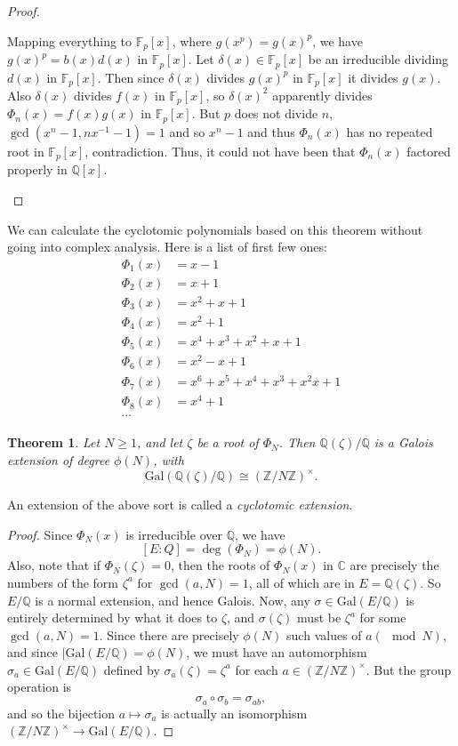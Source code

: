 \documentclass[12pt]{report}
\newtheorem{thm}{Theorem}[section]
\theoremstyle{definition}
\def\ZZ{\mathbb{Z}}
\def\CC{\mathbb{C}}
\def\QQ{\mathbb{Q}}
\def\FF{\mathbb{F}}
\def\Gal{\text{Gal}}
\begin{document}
\begin{proof}
\begin{enumerate}
        Mapping everything to $\FF_p[x]$, where $g(x^p) = g(x)^p$, we have $g(x)^p= b(x)d(x)$ in $\FF_p[x]$. Let $\delta(x) \in \FF_p[x]$ be an irreducible dividing $d(x)$ in $\FF_p[x]$. Then since $\delta(x)$ divides $g(x)^p$ in $\FF_p[x]$ it divides $g(x)$. Also $\delta(x)$ divides $f(x)$ in $\FF_p[x]$, so $\delta(x)^2$ apparently divides $\Phi_n(x) = f(x)g(x)$ in $\FF_p[x]$. But $p$ does not divide $n$, $\gcd(x^n-1,nx^{-1}-1) = 1$ and so $x^n-1$ and thus $\Phi_n(x)$ has no repeated root in $\FF_p[x]$, contradiction. Thus, it could not have been that $\Phi_n(x)$ factored properly in $\QQ[x]$.
    \end{enumerate}
\end{proof}

We can calculate the cyclotomic polynomials based on this theorem without going into complex analysis. Here is a list of first few ones:
\begin{align*}
    \Phi_1(x) &= x-1 \\
    \Phi_2(x) &= x+1 \\
    \Phi_3(x) &= x^2+x+1 \\
    \Phi_4(x) &= x^2+1 \\
    \Phi_5(x) &= x^4+x^3+x^2+x+1 \\
    \Phi_6(x) &= x^2-x+1 \\
    \Phi_7(x) &= x^6+x^5+x^4+x^3+x^2x+1 \\
    \Phi_8(x) &= x^4+1 \\
    \cdots
\end{align*}

\begin{thm}
    Let $N \geq 1$, and let $\zeta$ be a root of $\Phi_N$. Then $\QQ(\zeta)/\QQ$ is a Galois extension of degree $\phi(N)$, with
    $$\Gal(\QQ(\zeta)/\QQ) \cong (\ZZ/N\ZZ)^\times.$$
\end{thm}

An extension of the above sort is called a \emph{cyclotomic extension}.

\begin{proof}
    Since $\Phi_N(x)$ is irreducible over $\QQ$, we have $$[E : Q] = \deg(\Phi_N) = \phi(N).$$
    Also, note that if $\Phi_N(\zeta) = 0$, then the roots of $\Phi_N(x)$ in $\CC$ are precisely the numbers of the form $\zeta^a$ for $\gcd(a,N) = 1$, all of which are in $E = \QQ(\zeta)$. So $E/\QQ$ is a normal extension, and hence Galois. Now, any $\sigma \in \Gal(E/\QQ)$ is entirely determined by what it does to $\zeta$, and $\sigma(\zeta)$ must be $\zeta^a$ for some $\gcd(a,N) = 1$. Since there are precisely $\phi(N)$ such values of $a (\mod N)$, and since $|\Gal(E/\QQ) = \phi(N)$, we must have an automorphism $\sigma_a \in \Gal(E/\QQ)$ defined by $\sigma_a(\zeta) = \zeta^a$ for each $a \in (\ZZ/N\ZZ)^\times$. But the group operation is $$\sigma_a \circ \sigma_b = \sigma_{ab},$$
    and so the bijection $a \mapsto \sigma_a$ is actually an isomorphism $(\ZZ/N\ZZ)^\times \to \Gal(E/\QQ)$.
\end{proof}
\end{document}
